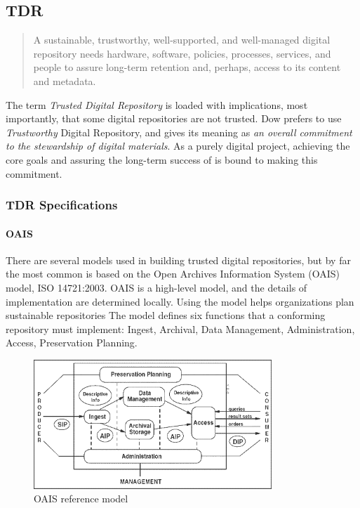 \subsection{TDR}
\begin{quote}A sustainable, trustworthy, well-supported, and well-managed digital repository needs hardware, software, policies, processes, services, and people to assure long-term retention and, perhaps, access to its content and metadata.\cite{dow_elizabeth_2009} \end{quote}
The term \emph{Trusted Digital Repository} is loaded with implications, most importantly, that some digital repositories are not trusted. Dow prefers to use \emph{Trustworthy} Digital Repository, and gives its meaning as \emph{an overall commitment to the stewardship of digital materials}\cite{dow_elizabeth_2009}. As a purely digital project, achieving the core goals and assuring the long-term success of \projectname{} is bound to making this commitment. 

\subsubsection{TDR Specifications}
\paragraph{OAIS}
There are several models used in building trusted digital repositories, but by far the most common is based on the Open Archives Information System (OAIS) model, ISO 14721:2003. OAIS is a high-level model, and the details of implementation are determined locally. Using the model helps organizations plan sustainable repositories\cite{harvey} The model defines six functions that a conforming repository must implement: Ingest, Archival, Data Management, Administration, Access, Preservation Planning.
\begin{figure}[H]
  \centering
  \includegraphics[width=0.8\textwidth]{OAIS.png}
  \caption{OAIS reference model\cite{oais_image}}
\end{figure}
